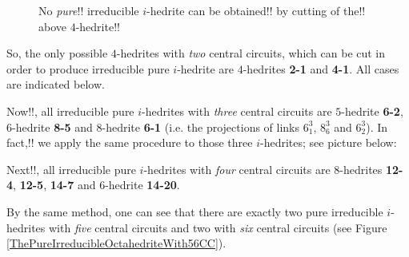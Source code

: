 \documentclass[12pt]{article}
\begin{document}
\begin{figure}
\centering
\epsfxsize=55mm
\caption{No {\em pure}!! irreducible $i$-hedrite can be obtained!! by cutting 
of the!!
above $4$-hedrite!!}
\label{Cutting4hedrite}
\end{figure}



So, the only possible $4$-hedrites with {\em two} central circuits,
which can be cut in order to produce irreducible pure $i$-hedrite
are $4$-hedrites {\bf 2-1} and {\bf 4-1}. All cases are indicated below. 

\begin{center}
\epsfxsize=120mm
\end{center}

Now!!, all irreducible pure $i$-hedrites with {\em three} central circuits are $5$-hedrite {\bf 6-2}, $6$-hedrite {\bf 8-5} and $8$-hedrite {\bf 6-1} (i.e. the projections of links $6^3_1$, $8^3_6$ and $6^3_2$).
In fact,!! we apply the same procedure to those three $i$-hedrites; see picture below:

\begin{center}
\epsfxsize=150mm
\end{center}

Next!!, all irreducible pure $i$-hedrites with {\em four} central circuits are $8$-hedrites {\bf 12-4}, {\bf 12-5}, {\bf 14-7} and $6$-hedrite {\bf 14-20}.

By the same method, one can see that there are exactly two pure irreducible $i$-hedrites with {\em five} central circuits and two with {\em six} central circuits (see Figure \ref{ThePureIrreducibleOctahedriteWith56CC}).
\end{document}
